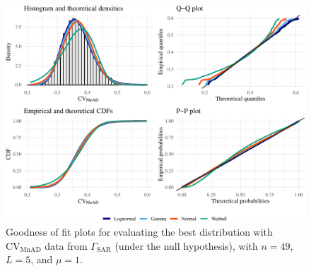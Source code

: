 \documentclass[remotesensing,article,submit,moreauthors,pdftex]{Definitions/mdpi}
\providecommand{\DIFaddbeginFL}{} %
\providecommand{\DIFaddendFL}{} %
\providecommand{\DIFdelbeginFL}{} %
\providecommand{\DIFdelendFL}{} %
\newcommand{\DIFscaledelfig}{0.5}
\newlength{\DIFdelgraphicswidth} %
\newlength{\DIFdelgraphicsheight} %
\newcommand{\DIFaddincludegraphics}[2][]{{\color{blue}\fbox{\DIFOincludegraphics[#1]{#2}}}} %
\newcommand{\DIFdelincludegraphics}[2][]{%
\sbox{\DIFdelgraphicsbox}{\DIFOincludegraphics[#1]{#2}}%
\settoboxwidth{\DIFdelgraphicswidth}{\DIFdelgraphicsbox} %
\settoboxtotalheight{\DIFdelgraphicsheight}{\DIFdelgraphicsbox} %
\scalebox{\DIFscaledelfig}{%
\parbox[b]{\DIFdelgraphicswidth}{\usebox{\DIFdelgraphicsbox}\\[-\baselineskip] \rule{\DIFdelgraphicswidth}{0em}}\llap{\resizebox{\DIFdelgraphicswidth}{\DIFdelgraphicsheight}{%
\setlength{\unitlength}{\DIFdelgraphicswidth}%
\begin{picture}(1,1)%
\thicklines\linethickness{2pt} %
{\color[rgb]{1,0,0}\put(0,0){\framebox(1,1){}}}%
{\color[rgb]{1,0,0}\put(0,0){\line( 1,1){1}}}%
{\color[rgb]{1,0,0}\put(0,1){\line(1,-1){1}}}%
\end{picture}%
}\hspace*{3pt}}} %
} %
\DeclareRobustCommand{\DIFaddbeginFL}{\DIFOaddbeginFL \let\includegraphics\DIFaddincludegraphics} %
\DeclareRobustCommand{\DIFaddendFL}{\DIFOaddendFL \let\includegraphics\DIFOincludegraphics} %
\DeclareRobustCommand{\DIFdelbeginFL}{\DIFOdelbeginFL \let\includegraphics\DIFdelincludegraphics} %
\DeclareRobustCommand{\DIFdelendFL}{\DIFOaddendFL \let\includegraphics\DIFOincludegraphics} %
\begin{document}
\begin{figure}[H]

{\centering \DIFdelbeginFL %
\DIFdelendFL \DIFaddbeginFL \includegraphics[width=1\linewidth]{R1-Identifying-Heterogeneity-in-SAR-Data-with-New-Test-Statistics_files/figure-latex/Plot_MnADmedian_gamma-1} 
\DIFaddendFL 

}

\caption{Goodness of fit plots for evaluating the best distribution with $\text{CV}_{\text{MnAD}}$ data from $\Gamma_{\text{SAR}}$ (under the null hypothesis), with  $n=49$, $L=5$, and $\mu=1$.}\label{fig:Plot_MnADmedian_gamma}
\end{figure}
\end{document}
